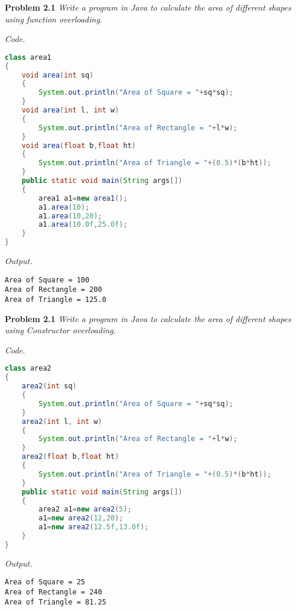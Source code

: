 \documentclass[12pt]{article}
\begin{document}

\textbf{Problem 2.1} \textit{Write a program in Java to calculate the area of different shapes using function overloading.}


\textit{Code.}

\begin{lstlisting}[language=Java]
class area1
{
	void area(int sq)
	{
		System.out.println("Area of Square = "+sq*sq);
	}
	void area(int l, int w)
	{
		System.out.println("Area of Rectangle = "+l*w);
	}
	void area(float b,float ht)
	{
		System.out.println("Area of Triangle = "+(0.5)*(b*ht));
	}
	public static void main(String args[])
	{
		area1 a1=new area1();
		a1.area(10);
		a1.area(10,20);
		a1.area(10.0f,25.0f);
	}
}
\end{lstlisting}

\textit{Output.}
\begin{lstlisting}
Area of Square = 100
Area of Rectangle = 200
Area of Triangle = 125.0
\end{lstlisting}



\textbf{Problem 2.1} \textit{Write a program in Java to calculate the area of different shapes using Constructor overloading.}


\textit{Code.}

\begin{lstlisting}[language=Java]
class area2
{
	area2(int sq)
	{
		System.out.println("Area of Square = "+sq*sq);
	}
	area2(int l, int w)
	{
		System.out.println("Area of Rectangle = "+l*w);
	}
	area2(float b,float ht)
	{
		System.out.println("Area of Triangle = "+(0.5)*(b*ht));
	}
	public static void main(String args[])
	{
		area2 a1=new area2(5);
		a1=new area2(12,20);
		a1=new area2(12.5f,13.0f);
	}
}
\end{lstlisting}

\textit{Output.}
\begin{lstlisting}
Area of Square = 25
Area of Rectangle = 240
Area of Triangle = 81.25
\end{lstlisting}

\newpage

\setlength{\fboxrule}{.5mm}\setlength{\fboxsep}{1.2mm}
\addtolength{\boxlength}{-4mm}
\begin{center}\end{center}
\vspace{5mm}
\end{document}
